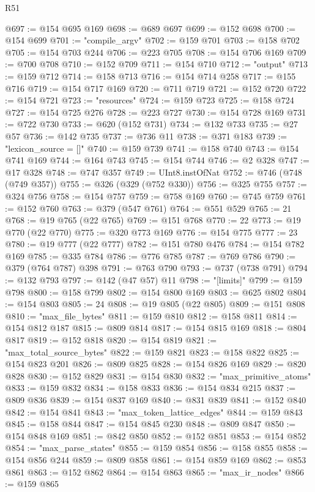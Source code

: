 \begin{lexlean}{R51}
\begin{coremodule}
@697 := @154 @695 @169
@698 := @689 @697
@699 := @152 @698
@700 := @154 @699
@701 := "compile_argv"
@702 := @159 @701
@703 := @158 @702
@705 := @154 @703 @244
@706 := @223 @705
@708 := @154 @706 @169
@709 := @700 @708
@710 := @152 @709
@711 := @154 @710
@712 := "output"
@713 := @159 @712
@714 := @158 @713
@716 := @154 @714 @258
@717 := @155 @716
@719 := @154 @717 @169
@720 := @711 @719
@721 := @152 @720
@722 := @154 @721
@723 := "resources"
@724 := @159 @723
@725 := @158 @724
@727 := @154 @725 @276
@728 := @223 @727
@730 := @154 @728 @169
@731 := @722 @730
@733 := @620 (@152 @731)
@734 := @132 @733
@735 := @27 @57
@736 := @142 @735
@737 := @736 @11
@738 := @371 @183
@739 := "lexicon_source = []"
@740 := @159 @739
@741 := @158 @740
@743 := @154 @741 @169
@744 := @164 @743
@745 := @154 @744
@746 := @2 @328
@747 := @17 @328
@748 := @747 @357
@749 := UInt8.instOfNat
@752 := @746 (@748 (@749 @357))
@755 := @326 (@329 (@752 @330))
@756 := @325 @755
@757 := @324 @756
@758 := @154 @757
@759 := @758 @169
@760 := @745 @759
@761 := @152 @760
@763 := @379 (@547 @761)
@764 := @551 @529
@765 := 21
@768 := @19 @765 (@22 @765)
@769 := @151 @768
@770 := 22
@773 := @19 @770 (@22 @770)
@775 := @320 @773 @169
@776 := @154 @775
@777 := 23
@780 := @19 @777 (@22 @777)
@782 := @151 @780 @476
@784 := @154 @782 @169
@785 := @335 @784
@786 := @776 @785
@787 := @769 @786
@790 := @379 (@764 @787) @398
@791 := @763 @790
@793 := @737 (@738 @791)
@794 := @132 @793
@797 := @142 (@47 @57) @11
@798 := "[limits]"
@799 := @159 @798
@800 := @158 @799
@802 := @154 @800 @169
@803 := @625 @802
@804 := @154 @803
@805 := 24
@808 := @19 @805 (@22 @805)
@809 := @151 @808
@810 := "max_file_bytes"
@811 := @159 @810
@812 := @158 @811
@814 := @154 @812 @187
@815 := @809 @814
@817 := @154 @815 @169
@818 := @804 @817
@819 := @152 @818
@820 := @154 @819
@821 := "max_total_source_bytes"
@822 := @159 @821
@823 := @158 @822
@825 := @154 @823 @201
@826 := @809 @825
@828 := @154 @826 @169
@829 := @820 @828
@830 := @152 @829
@831 := @154 @830
@832 := "max_primitive_atoms"
@833 := @159 @832
@834 := @158 @833
@836 := @154 @834 @215
@837 := @809 @836
@839 := @154 @837 @169
@840 := @831 @839
@841 := @152 @840
@842 := @154 @841
@843 := "max_token_lattice_edges"
@844 := @159 @843
@845 := @158 @844
@847 := @154 @845 @230
@848 := @809 @847
@850 := @154 @848 @169
@851 := @842 @850
@852 := @152 @851
@853 := @154 @852
@854 := "max_parse_states"
@855 := @159 @854
@856 := @158 @855
@858 := @154 @856 @244
@859 := @809 @858
@861 := @154 @859 @169
@862 := @853 @861
@863 := @152 @862
@864 := @154 @863
@865 := "max_ir_nodes"
@866 := @159 @865

\end{coremodule}
\end{lexlean}
